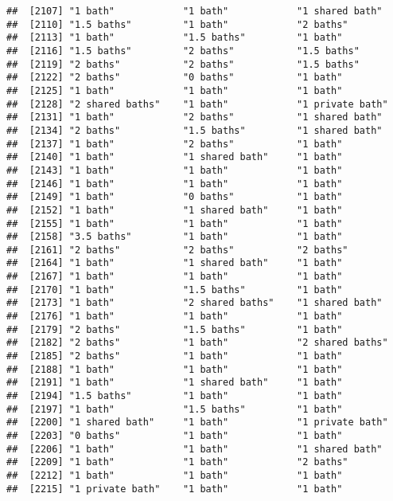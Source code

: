 \documentclass[
]{article}
\begin{document}
\begin{verbatim}
##  [2107] "1 bath"            "1 bath"            "1 shared bath"    
##  [2110] "1.5 baths"         "1 bath"            "2 baths"          
##  [2113] "1 bath"            "1.5 baths"         "1 bath"           
##  [2116] "1.5 baths"         "2 baths"           "1.5 baths"        
##  [2119] "2 baths"           "2 baths"           "1.5 baths"        
##  [2122] "2 baths"           "0 baths"           "1 bath"           
##  [2125] "1 bath"            "1 bath"            "1 bath"           
##  [2128] "2 shared baths"    "1 bath"            "1 private bath"   
##  [2131] "1 bath"            "2 baths"           "1 shared bath"    
##  [2134] "2 baths"           "1.5 baths"         "1 shared bath"    
##  [2137] "1 bath"            "2 baths"           "1 bath"           
##  [2140] "1 bath"            "1 shared bath"     "1 bath"           
##  [2143] "1 bath"            "1 bath"            "1 bath"           
##  [2146] "1 bath"            "1 bath"            "1 bath"           
##  [2149] "1 bath"            "0 baths"           "1 bath"           
##  [2152] "1 bath"            "1 shared bath"     "1 bath"           
##  [2155] "1 bath"            "1 bath"            "1 bath"           
##  [2158] "3.5 baths"         "1 bath"            "1 bath"           
##  [2161] "2 baths"           "2 baths"           "2 baths"          
##  [2164] "1 bath"            "1 shared bath"     "1 bath"           
##  [2167] "1 bath"            "1 bath"            "1 bath"           
##  [2170] "1 bath"            "1.5 baths"         "1 bath"           
##  [2173] "1 bath"            "2 shared baths"    "1 shared bath"    
##  [2176] "1 bath"            "1 bath"            "1 bath"           
##  [2179] "2 baths"           "1.5 baths"         "1 bath"           
##  [2182] "2 baths"           "1 bath"            "2 shared baths"   
##  [2185] "2 baths"           "1 bath"            "1 bath"           
##  [2188] "1 bath"            "1 bath"            "1 bath"           
##  [2191] "1 bath"            "1 shared bath"     "1 bath"           
##  [2194] "1.5 baths"         "1 bath"            "1 bath"           
##  [2197] "1 bath"            "1.5 baths"         "1 bath"           
##  [2200] "1 shared bath"     "1 bath"            "1 private bath"   
##  [2203] "0 baths"           "1 bath"            "1 bath"           
##  [2206] "1 bath"            "1 bath"            "1 shared bath"    
##  [2209] "1 bath"            "1 bath"            "2 baths"          
##  [2212] "1 bath"            "1 bath"            "1 bath"           
##  [2215] "1 private bath"    "1 bath"            "1 bath"           

\end{verbatim}
\end{document}
